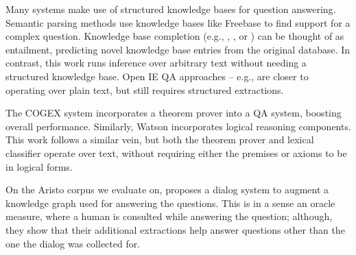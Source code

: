 Many systems make use of structured knowledge bases for question
  answering.
Semantic parsing methods 
  \cite{key:2005zettlemoyer-semantics,key:2011liang-semantics}
  use knowledge bases like Freebase to find support for a
  complex question.
Knowledge base completion 
  (e.g., , ,
  or ) can be thought of as entailment,
  predicting novel knowledge base entries from the original database.
In contrast, this work runs inference over arbitrary text without
  needing a structured knowledge base.
Open IE \cite{key:2010wu-openie,key:2012mausam-ollie}
  QA approaches -- e.g., 
  are closer to operating over plain text, but
  still requires structured extractions.

The COGEX system \cite{key:2003moldovan-trec} incorporates a theorem
  prover into a QA system, boosting overall performance.
Similarly, Watson \cite{key:2010ferrucci-watson} incorporates
  logical reasoning components.
This work follows a similar vein, but both the theorem prover
  and lexical classifier operate over text, without requiring either
  the premises or axioms to be in logical forms.
  

On the Aristo corpus we evaluate on,  proposes
  a dialog system to augment a knowledge graph used for answering the questions.
This is in a sense an oracle measure, where a human is consulted while answering
  the question; although, they show that their additional extractions help
  answer questions other than the one the dialog was collected for.














